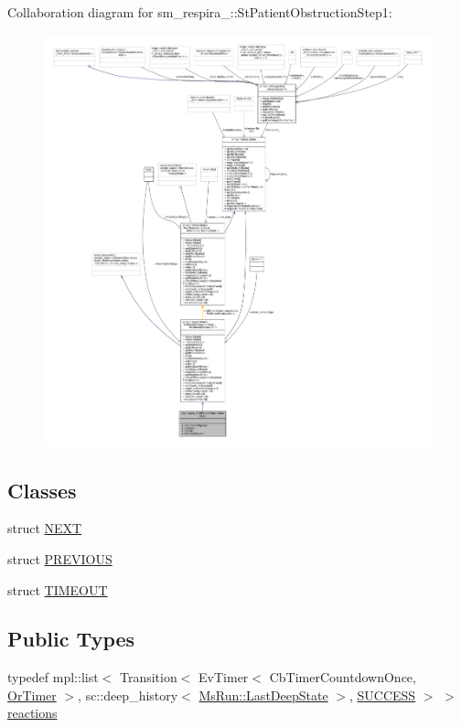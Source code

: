Collaboration diagram for sm\+\_\+respira\+\_\+:\+:St\+Patient\+Obstruction\+Step1\+:
\nopagebreak
\begin{figure}[H]
\begin{center}
\leavevmode
\includegraphics[width=350pt]{structsm__respira__1_1_1StPatientObstructionStep1__coll__graph}
\end{center}
\end{figure}
\subsection*{Classes}
\begin{DoxyCompactItemize}
\item 
struct \hyperlink{structsm__respira__1_1_1StPatientObstructionStep1_1_1NEXT}{N\+E\+XT}
\item 
struct \hyperlink{structsm__respira__1_1_1StPatientObstructionStep1_1_1PREVIOUS}{P\+R\+E\+V\+I\+O\+US}
\item 
struct \hyperlink{structsm__respira__1_1_1StPatientObstructionStep1_1_1TIMEOUT}{T\+I\+M\+E\+O\+UT}
\end{DoxyCompactItemize}
\subsection*{Public Types}
\begin{DoxyCompactItemize}
\item 
typedef mpl\+::list$<$ Transition$<$ Ev\+Timer$<$ Cb\+Timer\+Countdown\+Once, \hyperlink{classsm__respira__1_1_1OrTimer}{Or\+Timer} $>$, sc\+::deep\+\_\+history$<$ \hyperlink{classsmacc_1_1SmaccState_a60088405d2d99d468caa0baa3b2830a8}{Ms\+Run\+::\+Last\+Deep\+State} $>$, \hyperlink{classSUCCESS}{S\+U\+C\+C\+E\+SS} $>$ $>$ \hyperlink{structsm__respira__1_1_1StPatientObstructionStep1_ab9ffaa25ba44c387753d3104039d0ee6}{reactions}
\end{DoxyCompactItemize}
